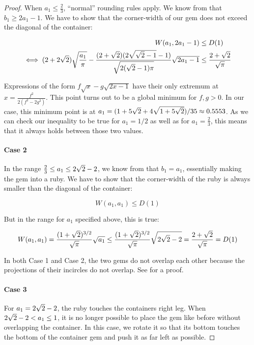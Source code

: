 \documentclass[a4paper,style=print,oneside,bibliography=totoc,nexus,lnum,extramargin]{tubsbook}
\begin{document}
\begin{proof}
    When $a_1 \le \frac{2}{3}$, “normal” rounding rules apply. We know from  that $b_1 \ge 2a_1 - 1$. We have to show that the corner-width of our gem does not exceed the diagonal of the container:

    \begin{align*}
        W(a_1, 2a_1-1) &\le D(1)\\
        \iff (2+2\sqrt{2})\sqrt{\frac{a_1}{\pi}} - \frac{(2+\sqrt{2})(2\sqrt{\sqrt{2}-1}-1)}{\sqrt{2(\sqrt{2}-1)\pi}}\sqrt{2a_1-1} &\le \frac{2+\sqrt{2}}{\sqrt{\pi}}
    \end{align*}

    Expressions of the form $f\sqrt{x} - g\sqrt{2x-1}$ have their only extremum at $x = \frac{f^2}{2(f^2-2g^2)}$. This point turns out to be a global minimum for $f,g > 0$.
    In our case, this minimum point is at $a_1 = (1+5\sqrt{2}+4\sqrt{1+5\sqrt{2}})/35 \approx 0.5553$.
    As we can check our inequality to be true for $a_1 = 1/2$ as well as for $a_1 = \frac 2 3$, this means that it always holds between those two values.

    \paragraph{Case 2}

    In the range $\frac{2}{3} \le a_1 \le 2\sqrt{2}-2$, we know from  that $b_1 = a_1$, essentially making the gem into a ruby. We have to show that the corner-width of the ruby is always smaller than the diagonal of the container:

    $$W(a_1, a_1) \le D(1)$$

    But in the range for $a_1$ specified above, this is true:

    $$W(a_1, a_1) = \frac{(1+\sqrt{2})^{3/2}}{\sqrt{\pi}}\sqrt{a_1} \le \frac{(1+\sqrt{2})^{3/2}}{\sqrt{\pi}}\sqrt{2\sqrt{2}-2} = \frac{2+\sqrt{2}}{\sqrt{\pi}} = D(1)$$

    In both Case 1 and Case 2, the two gems do not overlap each other because the projections of their incircles do not overlap. See  for a proof.

    \paragraph{Case 3}

    For $a_1 = 2\sqrt{2}-2$, the ruby touches the containers right leg.
    When $2\sqrt{2}-2 < a_1 \le 1$, it is no longer possible to place the gem like before without overlapping the container. In this case, we rotate it so that its bottom touches the bottom of the container gem and push it as far left as possible.


\end{proof}
\end{document}
